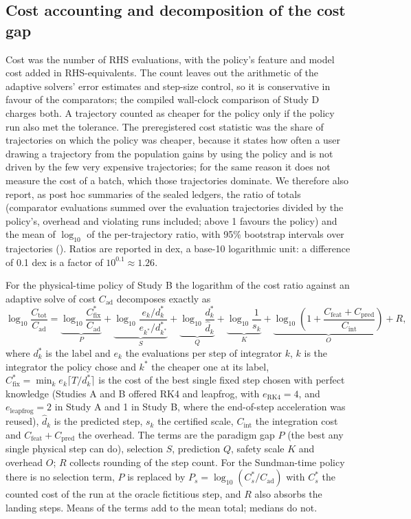 \documentclass[10pt,letterpaper]{article}
\begin{document}
\subsection*{Cost accounting and decomposition of the cost gap}
Cost was the number of RHS evaluations, with the policy's feature and model cost added in RHS-equivalents. The count leaves out the arithmetic of the adaptive solvers' error estimates and step-size control, so it is conservative in favour of the comparators; the compiled wall-clock comparison of Study D charges both. A trajectory counted as cheaper for the policy only if the policy run also met the tolerance. The preregistered cost statistic was the share of trajectories on which the policy was cheaper, because it states how often a user drawing a trajectory from the population gains by using the policy and is not driven by the few very expensive trajectories; for the same reason it does not measure the cost of a batch, which those trajectories dominate. We therefore also report, as post hoc summaries of the sealed ledgers, the ratio of totals (comparator evaluations summed over the evaluation trajectories divided by the policy's, overhead and violating runs included; above 1 favours the policy) and the mean of $\log_{10}$ of the per-trajectory ratio, with 95\% bootstrap intervals over trajectories (). Ratios are reported in dex, a base-10 logarithmic unit: a difference of 0.1 dex is a factor of $10^{0.1} \approx 1.26$.

For the physical-time policy of Study B the logarithm of the cost ratio against an adaptive solve of cost $C_{\mathrm{ad}}$ decomposes exactly as
\begin{equation}
\label{eq:decomp}
\log_{10}\frac{C_{\mathrm{tot}}}{C_{\mathrm{ad}}} =
\underbrace{\log_{10}\frac{C^{*}_{\mathrm{fix}}}{C_{\mathrm{ad}}}}_{P}
+ \underbrace{\log_{10}\frac{e_{k}/d^{*}_{k}}{e_{k^{*}}/d^{*}_{k^{*}}}}_{S}
+ \underbrace{\log_{10}\frac{d^{*}_{k}}{\hat{d}_{k}}}_{Q}
+ \underbrace{\log_{10}\frac{1}{s_{k}}}_{K}
+ \underbrace{\log_{10}\left(1 + \frac{C_{\mathrm{feat}} + C_{\mathrm{pred}}}{C_{\mathrm{int}}}\right)}_{O}
+ R,
\end{equation}
where $d^{*}_{k}$ is the label and $e_{k}$ the evaluations per step of integrator $k$, $k$ is the integrator the policy chose and $k^{*}$ the cheaper one at its label, $C^{*}_{\mathrm{fix}} = \min_{k} e_{k}\lceil T/d^{*}_{k}\rceil$ is the cost of the best single fixed step chosen with perfect knowledge (Studies A and B offered RK4 and leapfrog, with $e_{\mathrm{RK4}} = 4$, and $e_{\mathrm{leapfrog}} = 2$ in Study A and 1 in Study B, where the end-of-step acceleration was reused), $\hat{d}_{k}$ is the predicted step, $s_{k}$ the certified scale, $C_{\mathrm{int}}$ the integration cost and $C_{\mathrm{feat}} + C_{\mathrm{pred}}$ the overhead. The terms are the paradigm gap $P$ (the best any single physical step can do), selection $S$, prediction $Q$, safety scale $K$ and overhead $O$; $R$ collects rounding of the step count. For the Sundman-time policy there is no selection term, $P$ is replaced by $P_{s} = \log_{10}(C^{*}_{s}/C_{\mathrm{ad}})$ with $C^{*}_{s}$ the counted cost of the run at the oracle fictitious step, and $R$ also absorbs the landing steps. Means of the terms add to the mean total; medians do not.
\end{document}
